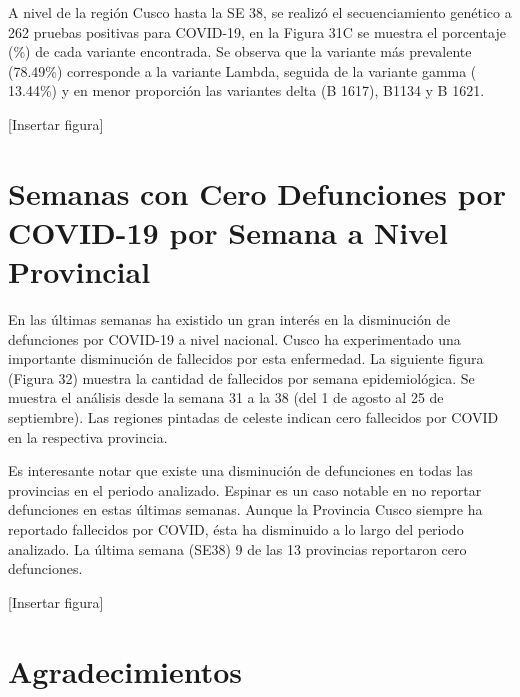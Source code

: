 \documentclass[12pt,a4paper,openany]{book}
\begin{document}
	A nivel de la región Cusco hasta la SE 38,  se realizó el secuenciamiento genético a 262 pruebas positivas para COVID-19, en la Figura 31C se muestra el porcentaje (\%) de cada variante encontrada. Se observa que la variante más prevalente (78.49\%) corresponde a la variante Lambda, seguida de la variante gamma ( 13.44\%) y en menor proporción las variantes delta (B 1617), B1134 y B 1621.
	
	[Insertar figura]
	
	\chapter*{Semanas con Cero Defunciones por COVID-19 por Semana a Nivel Provincial}
	\noindent En las últimas semanas ha existido un gran interés en la disminución de defunciones por COVID-19 a nivel nacional. Cusco ha experimentado una importante disminución de fallecidos por esta enfermedad.  La siguiente figura (Figura 32) muestra la cantidad de fallecidos por semana epidemiológica. Se muestra el análisis desde la semana 31 a la 38 (del 1 de agosto al 25 de septiembre). Las regiones pintadas de celeste indican cero fallecidos por COVID en la respectiva provincia.
	
	Es interesante notar que existe una disminución de defunciones en todas las provincias en el periodo analizado. Espinar es un caso notable en no reportar defunciones en estas últimas semanas. Aunque la Provincia Cusco siempre ha reportado fallecidos por COVID, ésta ha disminuido a lo largo del periodo analizado. La última semana (SE38) 9 de las 13 provincias reportaron cero defunciones.
	
	[Insertar figura]


	\chapter*{Agradecimientos}
		
\end{document}
